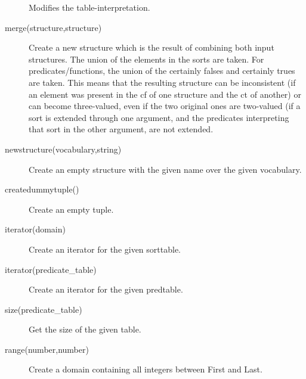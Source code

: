 \begin{description}
 		Modifies the table-interpretation.
	\item[merge(structure,structure)]
 		Create a new structure which is the result of combining both input structures. The union of the elements in the sorts are taken. For predicates/functions, 
 		the union of the certainly falses and certainly trues are taken. This means that the resulting structure can be inconsistent (if an element was present in the cf
 		of one structure and the ct of another) or can become three-valued, even if the two original ones are two-valued (if a sort is extended through one argument, and 
 		the predicates interpreting that sort in the other argument, are not extended.
	\item[newstructure(vocabulary,string)]
 		Create an empty structure with the given name over the given vocabulary.
 		
 	\item[createdummytuple()]
		Create an empty tuple.
	
	\item[iterator(domain)]
 		Create an iterator for the given sorttable.
	\item[iterator(predicate\_table)]
 		Create an iterator for the given predtable.
	\item[size(predicate\_table)]
 		Get the size of the given table.
 		
 	\item[range(number,number)]
 		Create a domain containing all integers between First and Last.
\end{description}


